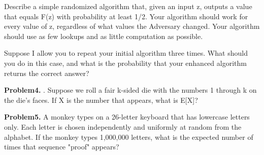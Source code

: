 \documentclass{article}
\begin{document}
Describe a simple randomized algorithm that, given an input z, outputs a value that equals F(z) with
probability at least 1/2. Your algorithm should work for every value of z, regardless of what values the
Adversary changed. Your algorithm should use as few lookups and as little computation as possible.


Suppose I allow you to repeat your initial algorithm three times. What should you do in this case, and
what is the probability that your enhanced algorithm returns the correct answer?



\noindent \textbf{Problem4.} . Suppose we roll a fair k-sided die with the numbers 1 through k on the die's faces. If X is the
number that appears, what is E[X]?



\noindent \textbf{Problem5.} A monkey types on a 26-letter keyboard that has lowercase letters only. Each letter is chosen
independently and uniformly at random from the alphabet. If the monkey types 1,000,000 letters, what is
the expected number of times that sequence "proof" appears?
\end{document}

